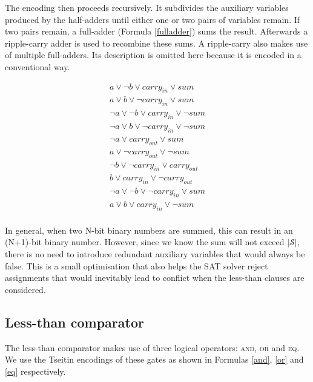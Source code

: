 \documentclass{article}
\begin{document}
\noindent The encoding then proceeds recursively. It subdivides the auxiliary
variables produced by the half-adders until either one or two pairs of variables
remain. If two pairs remain, a full-adder (Formula \ref{fulladder}) sums the
result. Afterwards a ripple-carry adder is used to recombine these sums. A
ripple-carry also makes use of multiple full-adders. Its description is omitted
here because it is encoded in a conventional way.

\begin{equation}
  \label{fulladder}
  \begin{split}
    a \lor \neg{b} \lor carry_{in} \lor sum \\
    a \lor b \lor \neg{carry_{in}} \lor sum \\
    \neg{a} \lor \neg{b} \lor carry_{in} \lor \neg{sum} \\
    \neg{a} \lor b \lor \neg{carry_{in}} \lor \neg{sum} \\
    \neg{a} \lor carry_{out} \lor sum \\
    a \lor \neg{carry_{out}}\lor \neg{sum} \\
    \neg{b} \lor \neg{carry_{in}} \lor carry_{out} \\
    b \lor carry_{in} \lor \neg{carry_{out}} \\
    \neg{a} \lor \neg{b} \lor \neg{carry_{in}} \lor sum \\
    a \lor b \lor carry_{in} \lor \neg{sum} \\
  \end{split}
\end{equation}\break

\noindent In general, when two N-bit binary numbers are summed, this can result
in an (N+1)-bit binary number. However, since we know the sum will not exceed
$\vert \mathscr{S} \vert$, there is no need to introduce redundant auxiliary
variables that would always be false. This is a small optimisation that also
helps the SAT solver reject assignments that would inevitably lead to conflict
when the less-than clauses are considered.

\subsection{Less-than comparator}

The less-than comparator makes use of three logical operators: \textsc{and},
\textsc{or} and \textsc{eq}. We use the Tseitin encodings of these gates as
shown in Formulas \ref{and}, \ref{or} and \ref{eq} respectively.
\end{document}
